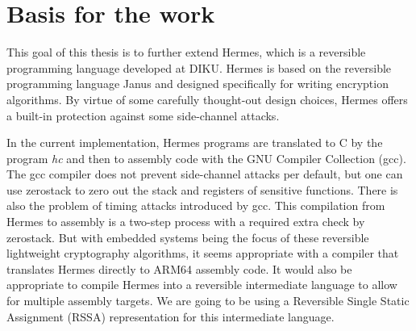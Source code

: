 \section{Basis for the work}
This goal of this thesis is to further extend Hermes, which is a reversible programming language developed at DIKU.
Hermes is based on the reversible programming language Janus and designed specifically for writing encryption algorithms\cite{MogensenHermes}.
By virtue of some carefully thought-out design choices, Hermes offers a built-in protection against some side-channel attacks.

In the current implementation, Hermes programs are translated to C by the program \emph{hc} and then to assembly code with the GNU Compiler Collection (gcc). The gcc compiler does not prevent side-channel attacks per default, but one can use zerostack\cite{Github.zerostack} to zero out the stack and registers of sensitive functions.
There is also the problem of timing attacks introduced by gcc\cite{Simon2018}.
This compilation from Hermes to assembly is a two-step process with a required extra check by zerostack. But with embedded systems being the focus of these reversible lightweight cryptography algorithms, it seems appropriate with a compiler that translates Hermes directly to ARM64 assembly code.
It would also be appropriate to compile Hermes into a reversible intermediate language to allow for multiple assembly targets. We are going to be using a Reversible Single Static Assignment (RSSA) representation for this intermediate language.
